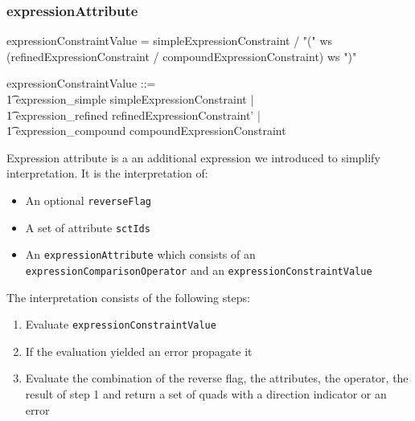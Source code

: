 \documentclass{article}
\def\spec#1{{\tt #1}}
\def\bnf#1{{\scriptsize {{#1}} }}
\begin{document}
\subsubsection{expressionAttribute}

\begin{framed}
\noindent
\bnf{expressionConstraintValue = simpleExpressionConstraint / "(" ws (refinedExpressionConstraint / compoundExpressionConstraint) ws ")"}
\end{framed}

\begin{zed}
expressionConstraintValue ::= \\
\t1 expression\_simple \ldata simpleExpressionConstraint \rdata | \\
\t1 expression\_refined \ldata refinedExpressionConstraint' \rdata | \\
\t1 expression\_compound \ldata compoundExpressionConstraint \rdata
\end{zed}

Expression attribute is a an additional expression we introduced to simplify interpretation.  It is the interpretation of:
\begin{itemize}[noitemsep,nolistsep]
\item An optional \spec{reverseFlag}
\item A set of attribute \spec{sctIds}
\item An \spec{expressionAttribute} which consists of an \spec{expressionComparisonOperator} and an \spec{expressionConstraintValue}
\end{itemize}

The interpretation consists of the following steps:
\begin{enumerate}
\item Evaluate \spec{expressionConstraintValue}
\item If the evaluation yielded an error propagate it
\item Evaluate the combination of the reverse flag, the attributes, the operator, the result of step 1 and return a set of quads with a direction indicator or an error
\end{enumerate}
\end{document}
